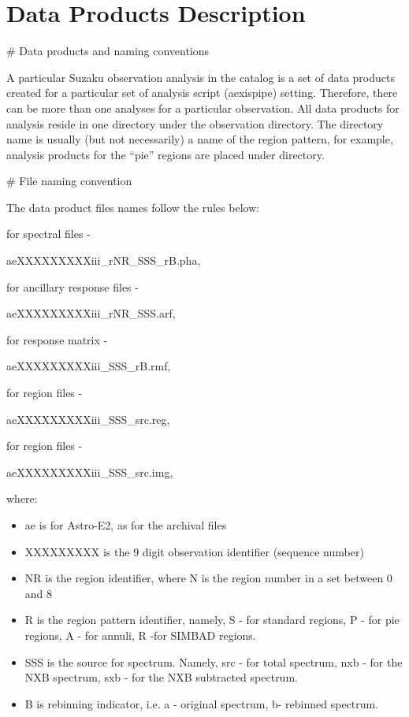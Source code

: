 \documentclass[letterpaper,10pt,english]{sphinxmanual}
\begin{document}
\chapter{Data Products Description}
\label{\detokenize{products:data-products-description}}\label{\detokenize{products::doc}}
\# Data products and naming conventions

A particular Suzaku observation analysis in the catalog is a set of data products created for a particular set of analysis script (aexispipe) setting. Therefore, there can be more than one analyses for a particular observation. All data products for analysis reside in one directory under the observation directory. The directory name is usually (but not necessarily) a name of the region pattern, for example, analysis products for the ``pie'' regions are placed under  directory.

\# File naming convention

The data product files names follow the rules below:

for spectral files -

aeXXXXXXXXXiii\_rNR\_SSS\_rB.pha,

for ancillary response files -

aeXXXXXXXXXiii\_rNR\_SSS.arf,

for response matrix -

aeXXXXXXXXXiii\_SSS\_rB.rmf,

for region files -

aeXXXXXXXXXiii\_SSS\_src.reg,

for region files -

aeXXXXXXXXXiii\_SSS\_src.img,

where:
\begin{itemize}
\item {} 
ae is for Astro-E2, as for the archival files

\item {} 
XXXXXXXXX is the 9 digit observation identifier (sequence number)

\item {} 
NR is the region identifier, where N is the region number in a set between 0 and 8

\item {} 
R is the region pattern identifier, namely, S - for standard regions, P - for pie regions, A - for annuli, R -for SIMBAD regions.

\item {} 
SSS is the source for spectrum. Namely, src - for total spectrum, nxb - for the NXB spectrum, sxb - for the NXB subtracted spectrum.

\item {} 
B is rebinning indicator, i.e. a - original spectrum, b- rebinned spectrum.

\end{itemize}
\end{document}
